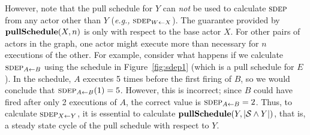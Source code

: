 However, note that the pull schedule for $Y$ can {\it not} be used to
calculate $\textsc{sdep}$ from any actor other than $Y$ ({\it e.g.,}
$\sdepf{W}{X}$).  The guarantee provided by ${\bf pullSchedule}(X, n)$
is only with respect to the base actor $X$. For other pairs of actors
in the graph, one actor might execute more than necessary for $n$
executions of the other.  For example, consider what happens if we
calculate $\sdepf{A}{B}$ using the schedule in Figure~\ref{fig:sdep1}
(which is a pull schedule for $E$).  In the schedule, $A$ executes 5
times before the first firing of $B$, so we would conclude that
$\sdepf{A}{B}(1) = 5$.  However, this is incorrect; since $B$ could
have fired after only 2 executions of $A$, the correct value is
$\sdepf{A}{B} = 2$.  Thus, to calculate $\sdepf{X}{Y}$, it is
essential to calculate ${\bf pullSchedule}(Y, |{\cal S} \wedge Y|)$,
that is, a steady state cycle of the pull schedule with respect to
$Y$.




